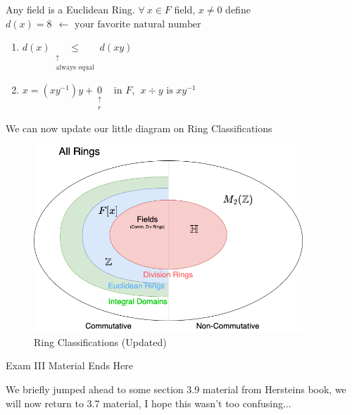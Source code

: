 \begin{example}
    Any field is a Euclidean Ring. $\forall \ x \in F$ field, $x\neq 0$ define $d(x)=8 \ \ \leftarrow \text{ your favorite natural number}$
    \begin{enumerate}
        \item $d(x) \underset{\substack{\uparrow \\ \text{always equal}}}{\leq} d(xy)$
        \item $x=(xy^{-1})y +\underset{\substack{\uparrow \\ r}}{0} \ \ \ \text{ in }F, \ \ x\div y \text{ is }xy^{-1}$
    \end{enumerate}
\end{example}
\noindent We can now update our little diagram on Ring Classifications
\begin{figure}[h!]
    \centering
    \includegraphics[width=0.9\textwidth]{Figures/RingClassifications_Euclidean.png}
    \caption{Ring Classifications (Updated)}
    \label{fig:ring-classifications-eucl}
\end{figure}
\begin{tcolorbox}
    \begin{center}
        Exam III Material Ends Here
    \end{center}
\end{tcolorbox}
\begin{tcolorbox}
    We briefly jumped ahead to some section 3.9 material from Hersteins book, we will now return to 3.7 material, I hope this wasn't too confusing...
\end{tcolorbox}
\newpage

\setcounter{section}{6}
